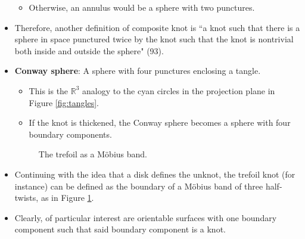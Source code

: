 \documentclass[titlepage]{article}
\numberwithin{figure}{section}
\numberwithin{table}{section}
\numberwithin{equation}{section}
\newcommand{\dq}[2]{``#1" (#2).}
\begin{document}
\begin{itemize}
\begin{itemize}
        \item Otherwise, an annulus would be a sphere with two punctures.
    \end{itemize}
    \item Therefore, another definition of composite knot is \dq{a knot such that there is a sphere in space punctured twice by the knot such that the knot is nontrivial both inside and outside the sphere}{93}
    \item \textbf{Conway sphere}: A sphere with four punctures enclosing a tangle.
    \begin{itemize}
        \item This is the $\mathbb{R}^3$ analogy to the cyan circles in the projection plane in Figure \ref{fig:tangles}.
        \item If the knot is thickened, the Conway sphere becomes a sphere with four boundary components.
    \end{itemize}
    \begin{figure}[h!]
        \centering
        \vspace{-0.7cm}
        \caption{The trefoil as a M\"{o}bius band.}
        \label{fig:trefoilmobius}
    \end{figure}
    \item Continuing with the idea that a disk defines the unknot, the trefoil knot (for instance) can be defined as the boundary of a M\"{o}bius band of three half-twists, as in Figure \ref{fig:trefoilmobius}.
    \item Clearly, of particular interest are orientable surfaces with one boundary component such that said boundary component is a knot.
\end{itemize}
\end{document}
